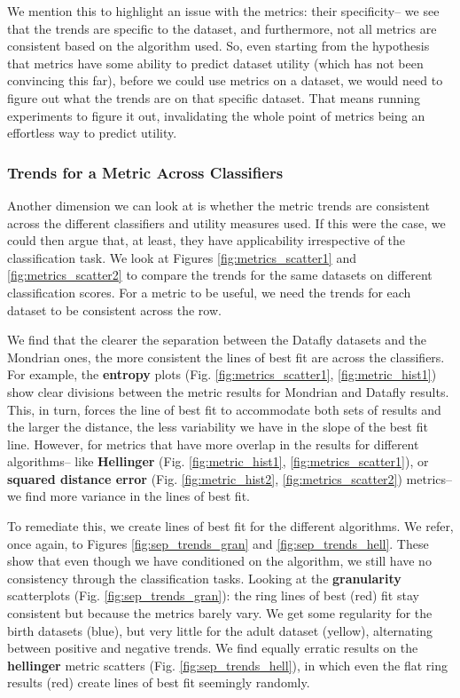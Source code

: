 We mention this to highlight an issue with the metrics: their specificity-- we see that the trends are specific to the dataset, and furthermore, not all metrics are consistent based on the algorithm used. So, even starting from the hypothesis that metrics have some ability to predict dataset utility (which has not been convincing this far), before we could use metrics on a dataset, we would need to figure out what the trends are on that specific dataset. That means running experiments to figure it out, invalidating the whole point of metrics being an effortless way to predict utility.

\subsubsection{Trends for a Metric Across Classifiers}
Another dimension we can look at is whether the metric trends are consistent across the different classifiers and utility measures used. If this were the case, we could then argue that, at least, they have applicability irrespective of the classification task. We look at Figures \ref{fig:metrics_scatter1} and \ref{fig:metrics_scatter2} to compare the trends for the same datasets on different classification scores. For a metric to be useful, we need the trends for each dataset to be consistent across the row.

We find that the clearer the separation between the Datafly datasets and the Mondrian ones, the more consistent the lines of best fit are across the classifiers. For example, the \textbf{entropy} plots (Fig. \ref{fig:metrics_scatter1}, \ref{fig:metric_hist1}) show clear divisions between the metric results for Mondrian and Datafly results. This, in turn, forces the line of best fit to accommodate both sets of results and the larger the distance, the less variability we have in the slope of the best fit line. However, for metrics that have more overlap in the results for different algorithms-- like \textbf{Hellinger} (Fig. \ref{fig:metric_hist1}, \ref{fig:metrics_scatter1}), or \textbf{squared distance error} (Fig. \ref{fig:metric_hist2}, \ref{fig:metrics_scatter2}) metrics-- we find more variance in the lines of best fit. 

To remediate this, we create lines of best fit for the different algorithms. We refer, once again, to Figures \ref{fig:sep_trends_gran} and \ref{fig:sep_trends_hell}. These show that even though we have conditioned on the algorithm, we still have no consistency through the classification tasks. Looking at the \textbf{granularity} scatterplots (Fig. \ref{fig:sep_trends_gran}): the ring lines of best (red) fit stay consistent but because the metrics barely vary. We get some regularity for the birth datasets (blue), but very little for the adult dataset (yellow), alternating between positive and negative trends. We find equally erratic results on the \textbf{hellinger} metric scatters (Fig. \ref{fig:sep_trends_hell}), in which even the flat ring results (red) create lines of best fit seemingly randomly.


